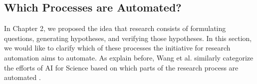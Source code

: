 
\subsection{Which Processes are Automated?}
In Chapter 2, we proposed the idea that research consists of formulating questions, generating hypotheses, and verifying those hypotheses. In this section, we would like to clarify which of these processes the initiative for research automation aims to automate. As explain before, Wang et al. similarly categorize the efforts of AI for Science based on which parts of the research process are automated \cite{wang2023scientific}. 

